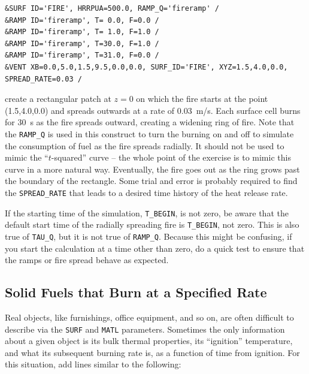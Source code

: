 \documentclass[11pt]{book}
\newcommand{\ct}{\tt\small}
\begin{document}
\footnotesize
\begin{verbatim}
&SURF ID='FIRE', HRRPUA=500.0, RAMP_Q='fireramp' /
&RAMP ID='fireramp', T= 0.0, F=0.0 /
&RAMP ID='fireramp', T= 1.0, F=1.0 /
&RAMP ID='fireramp', T=30.0, F=1.0 /
&RAMP ID='fireramp', T=31.0, F=0.0 /
&VENT XB=0.0,5.0,1.5,9.5,0.0,0.0, SURF_ID='FIRE', XYZ=1.5,4.0,0.0, SPREAD_RATE=0.03 /
\end{verbatim}
\normalsize

\noindent
create a rectangular patch at $z=0$ on which the fire starts at the
point (1.5,4.0,0.0) and spreads outwards at a rate of 0.03~m/s. Each surface cell
burns for 30~s as the fire spreads outward, creating a widening ring of fire. Note that the {\ct RAMP\_Q} is used in this
construct to turn the burning on and off to simulate the consumption of fuel as the fire spreads radially. It should not
be used to mimic the ``$t$-squared'' curve -- the whole point of the exercise is to mimic this curve in a more natural way.
Eventually, the fire goes out as the ring grows past the boundary of the rectangle.
Some trial and error is probably required to find the {\ct SPREAD\_RATE} that
leads to a desired time history of the heat release rate.

\begin{warning}
If the starting time of the simulation, {\ct T\_BEGIN}, is not zero, be aware that the default start time of the radially spreading
fire is {\ct T\_BEGIN}, not zero. This is also true of {\ct TAU\_Q}, but it is not true of {\ct RAMP\_Q}. Because this might be
confusing, if you start the calculation at a time other than zero, do a quick test to ensure that the ramps or fire spread behave as
expected.
\end{warning}




\subsection{Solid Fuels that Burn at a Specified Rate}

\label{info:specified_burning}

Real objects, like furnishings, office equipment, and so on, are
often difficult to describe via the {\ct SURF} and {\ct MATL}
parameters. Sometimes the only information about a given object is its
bulk thermal properties, its ``ignition'' temperature, and what its
subsequent burning rate is, as a function of time from ignition. For
this situation, add lines similar to the following:
\end{document}
